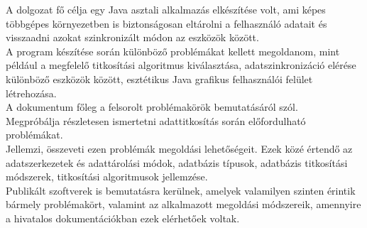 
A dolgozat fő célja egy Java asztali alkalmazás elkészítése volt, ami képes többgépes környezetben is biztonságosan eltárolni a felhasználó adatait és visszaadni azokat szinkronizált módon az eszközök között.
\\ \indent A program készítése során különböző problémákat kellett megoldanom, mint például a megfelelő titkosítási algoritmus kiválasztása, adatszinkronizáció elérése különböző eszközök között, esztétikus Java grafikus felhasználói felület létrehozása.
\\ \indent A dokumentum főleg a felsorolt problémakörök bemutatásáról szól. 
\\ Megpróbálja részletesen ismertetni adattitkosítás során előfordulható problémákat. 
\\ Jellemzi, összeveti ezen problémák megoldási lehetőségeit. Ezek közé értendő az adatszerkezetek és adattárolási módok, adatbázis típusok, adatbázis titkosítási módszerek, titkosítási algoritmusok jellemzése. 
\\ Publikált szoftverek is bemutatásra kerülnek, amelyek valamilyen szinten érintik bármely problémakört, valamint az alkalmazott megoldási módszereik, amennyire a hivatalos dokumentációkban ezek elérhetőek voltak.
